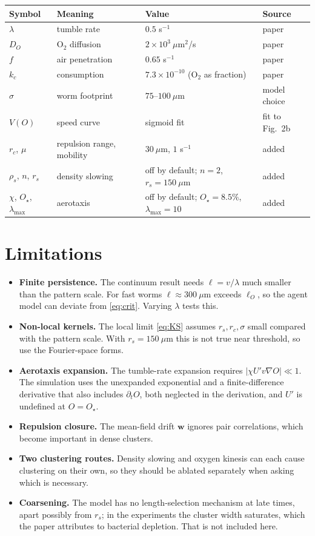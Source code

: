 \documentclass[11pt,a4paper]{article}
\newcommand{\vect}[1]{\bm{#1}}
\newcommand{\Ostar}{O_{\star}}
\begin{document}
\begin{table}[h]
\centering
\begin{tabular}{llll}
\toprule
Symbol & Meaning & Value & Source\\
\midrule
$\lambda$ & tumble rate & $0.5$ s$^{-1}$ & paper\\
$D_O$ & O$_2$ diffusion & $2\times10^{3}~\mu$m$^2$/s & paper\\
$f$ & air penetration & $0.65$ s$^{-1}$ & paper\\
$k_c$ & consumption & $7.3\times10^{-10}$ (O$_2$ as fraction) & paper\\
$\sigma$ & worm footprint & $75$--$100~\mu$m & model choice\\
$V(O)$ & speed curve & sigmoid fit & fit to Fig.~2b\\
$r_c$, $\mu$ & repulsion range, mobility & $30~\mu$m, $1$ s$^{-1}$ & added\\
$\rho_s$, $n$, $r_s$ & density slowing & off by default; $n=2$, $r_s=150~\mu$m & added\\
$\chi$, $\Ostar$, $\lambda_{\max}$ & aerotaxis & off by default; $\Ostar=8.5\%$, $\lambda_{\max}=10$ & added\\
\bottomrule
\end{tabular}
\end{table}

\section{Limitations}
\begin{itemize}
\item \textbf{Finite persistence.} The continuum result needs $\ell=v/\lambda$ much smaller than the pattern scale. For fast worms $\ell\approx300~\mu$m exceeds $\ell_O$, so the agent model can deviate from \eqref{eq:crit}. Varying $\lambda$ tests this.
\item \textbf{Non-local kernels.} The local limit \eqref{eq:KS} assumes $r_s,r_c,\sigma$ small compared with the pattern scale. With $r_s=150~\mu$m this is not true near threshold, so use the Fourier-space forms.
\item \textbf{Aerotaxis expansion.} The tumble-rate expansion requires $|\chi U'v\nabla O|\ll1$. The simulation uses the unexpanded exponential and a finite-difference derivative that also includes $\partial_tO$, both neglected in the derivation, and $U'$ is undefined at $O=\Ostar$.
\item \textbf{Repulsion closure.} The mean-field drift $\vect{w}$ ignores pair correlations, which become important in dense clusters.
\item \textbf{Two clustering routes.} Density slowing and oxygen kinesis can each cause clustering on their own, so they should be ablated separately when asking which is necessary.
\item \textbf{Coarsening.} The model has no length-selection mechanism at late times, apart possibly from $r_s$; in the experiments the cluster width saturates, which the paper attributes to bacterial depletion. That is not included here.
\end{itemize}
\end{document}
